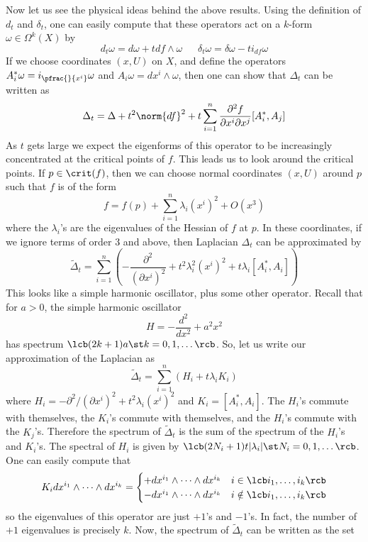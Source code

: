 Now let us see the physical ideas behind the above results. Using the definition of $d_t$ and $\delta_t$, one can easily compute that these operators act on a $k$-form $\omega \in \Omega^k(X)$ by
\[ d_t \omega = d\omega + t df \wedge \omega \ \ \ \ \ \ \ \delta_t \omega = \delta \omega - t i_{df} \omega \]
If we choose coordinates $(x,U)$ on $X$, and define the operators $A_i^* \omega = i_{\pfrac{}{x^i}} \omega$ and $A_i \omega = dx^i \wedge \omega$, then one can show that $\Delta_t$ can be written as
\[ \Delta_t = \Delta + t^2 \norm{df}^2 + t \sum_{i=1}^n \frac{\partial^2 f}{\partial x^i \partial x^j} [A_i^*, A_j] \]
As $t$ gets large we expect the eigenforms of this operator to be increasingly concentrated at the critical points of $f$. This leads us to look around the critical points. If $p \in \crit(f)$, then we can choose normal coordinates $(x,U)$ around $p$ such that $f$ is of the form
\[ f = f(p) + \sum_{i=1}^n \lambda_i (x^i)^2 + O(x^3) \]
where the $\lambda_i$'s are the eigenvalues of the Hessian of $f$ at $p$. In these coordinates, if we ignore terms of order 3 and above, then Laplacian $\Delta_t$ can be approximated by
\[ \widetilde{\Delta}_t = \sum_{i=1}^n \left( - \frac{\partial^2}{(\partial x^i)^2} + t^2 \lambda_i^2 (x^i)^2 + t \lambda_i [A_i^*,A_i] \right) \]
This looks like a simple harmonic oscillator, plus some other operator. Recall that for $a>0$, the simple harmonic oscillator
\[ H = -\frac{d^2}{dx^2} + a^2 x^2 \]
has spectrum $\lcb (2k+1)a \st k=0,1,\ldots \rcb$. So, let us write our approximation of the Laplacian as
\[ \widetilde{\Delta}_t = \sum_{i=1}^n \left( H_i + t\lambda_i K_i \right) \]
where $H_i = -\partial^2 / (\partial x^i)^2 + t^2\lambda_i (x^i)^2$ and $K_i = [A_i^*,A_i]$. The $H_i$'s commute with themselves, the $K_i$'s commute with themselves, and the $H_i$'s commute with the $K_j$'s. Therefore the spectrum of $\widetilde\Delta_t$ is the sum of the spectrum of the $H_i$'s and $K_i$'s. The spectral of $H_i$ is given by $\lcb (2N_i+1)t|\lambda_i| \st N_i=0,1,\ldots \rcb$. One can easily compute that
\[ K_i dx^{i_1} \wedge \cdots \wedge dx^{i_k} = \begin{cases} +dx^{i_1} \wedge \cdots \wedge dx^{i_k} & i \in \lcb i_1,\ldots,i_k \rcb \\ -dx^{i_1} \wedge \cdots \wedge dx^{i_k} & i \notin \lcb i_1,\ldots,i_k \rcb \end{cases} \]
so the eigenvalues of this operator are just $+1$'s and $-1$'s. In fact, the number of $+1$ eigenvalues is precisely $k$. Now, the spectrum of $\widetilde\Delta_t$ can be written as the set
